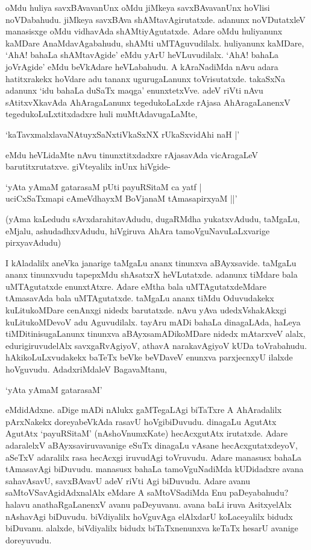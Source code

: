 oMdu huliya savxBAvavanUnx oMdu jiMkeya savxBAvavanUnx hoVlisi noVDabahudu. jiMkeya savxBAva shAMtavAgirutatxde. adanunx noVDutatxleV manasisxge oMdu vidhavAda shAMtiyAgutatxde. Adare oMdu huliyanunx kaMDare AnaMdavAgabahudu, shAMti uMTAguvudilalx. huliyanunx kaMDare, `AhA! bahaLa shAMtavAgide' eMdu yArU heVLuvudilalx. `AhA! bahaLa joVrAgide' eMdu beVkAdare heVLabahudu. A kAraNadiMda nAvu adara hatitxrakekx hoVdare adu tananx ugurugaLanunx toVrisutatxde. takaSxNa adanunx `idu bahaLa duSaTx maqga' enunxtetxVve. adeV riVti nAvu sAtitxvXkavAda AhAragaLanunx tegedukoLaLxde rAjasa AhAragaLanenxV tegedukoLuLxtitxdadxre huli muMtAdavugaLaMte,


\begin{shloka}
`kaTavxmalxlavaNAtuyxSaNxtiVkaSxNX rUkaSxvidAhi naH |'
\end{shloka}

\noindent eMdu heVLidaMte nAvu tinunxtitxdadxre rAjasavAda vicAragaLeV barutitxrutatxve. giVteyalilx inUnx hiVgide-

\begin{shloka}
`yAta yAmaM gatarasaM pUti payuRSitaM ca yatf |\\
uciCxSaTxmapi cAmeVdhayxM BoVjanaM tAmasapirxyaM ||'
\end{shloka}

(yAma kaLedudu sAvxdarahitavAdudu, dugaRMdha yukatxvAdudu, taMgaLu, eMjalu, ashudadhxvAdudu, hiVgiruva AhAra tamoVguNavuLaLxvarige pirxyavAdudu)

I kAladalilx aneVka janarige taMgaLu ananx tinunxva aBAyxsavide. taMgaLu ananx tinunxvudu tapepxMdu shAsatxrX heVLutatxde. adanunx tiMdare bala uMTAgutatxde enunxtAtxre. Adare eMtha bala uMTAgutatxdeMdare tAmasavAda bala uMTAgutatxde. taMgaLu ananx tiMdu Oduvudakekx kuLitukoMDare cenAnxgi nidedx barutatxde. nAvu yAva udedxVshakAkxgi kuLitukoMDevoV adu Aguvudilalx. tayAru mADi bahaLa dinagaLAda, haLeya tiMDitinisugaLanunx tinunxva aBAyxsamADikoMDare nidedx mAtarxveV alalx, edurigiruvudelAlx savxgaRvAgiyoV, athavA narakavAgiyoV kUDa toVrabahudu. hAkikoLuLxvudakekx baTeTx beVke beVDaveV enunxva parxjecnxyU ilalxde hoVguvudu. AdadxriMdaleV BagavaMtanu,

\begin{shloka}
`yAta yAmaM gatarasaM'
\end{shloka}


eMdidAdxne. aDige mADi nAlukx gaMTegaLAgi biTaTxre A AhAradalilx pArxNakekx doreyabeVkAda rasavU hoVgibiDuvudu. dinagaLu AgutAtx AgutAtx `payuRSitaM' (nAshoVnumxKate) hecAcxgutAtx irutatxde. Adare adaralelxV aBAyxsaviruvavanige eSuTx dinagaLu vAsane hecAcxgutatxdeyoV, aSeTxV adaralilx rasa hecAcxgi iruvudAgi toVruvudu. Adare manasusx bahaLa tAmasavAgi biDuvudu. manasusx bahaLa tamoVguNadiMda kUDidadxre avana sahavAsavU, savxBAvavU adeV riVti Agi biDuvudu. Adare avanu saMtoVSavAgidAdxnalAlx eMdare A saMtoVSadiMda Enu paDeyabahudu? halavu anathaRgaLanenxV avanu paDeyuvanu. avana baLi iruva AsitxyelAlx nAshavAgi biDuvudu. biVdiyalilx hoVguvAga elAlxdarU koLaceyalilx bidudx biDuvanu. alalxde, biVdiyalilx bidudx biTaTxnenunxva keTaTx hesarU avanige doreyuvudu.

